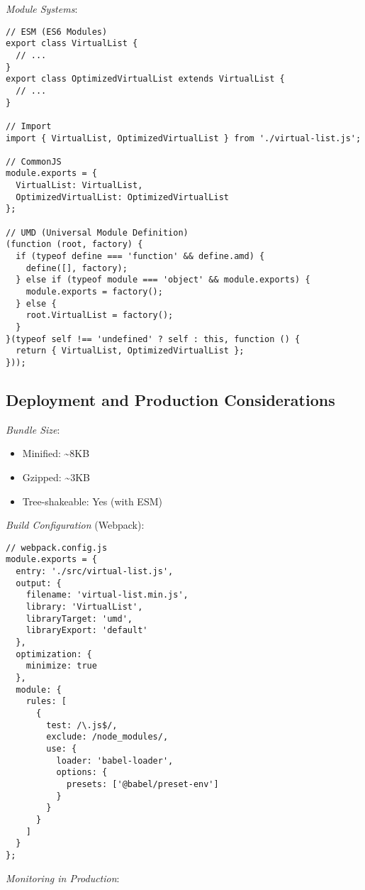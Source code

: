 \documentclass[11pt]{article}
\begin{document}
\emph{Module Systems}:

\begin{verbatim}
// ESM (ES6 Modules)
export class VirtualList {
  // ...
}
export class OptimizedVirtualList extends VirtualList {
  // ...
}

// Import
import { VirtualList, OptimizedVirtualList } from './virtual-list.js';

// CommonJS
module.exports = {
  VirtualList: VirtualList,
  OptimizedVirtualList: OptimizedVirtualList
};

// UMD (Universal Module Definition)
(function (root, factory) {
  if (typeof define === 'function' && define.amd) {
    define([], factory);
  } else if (typeof module === 'object' && module.exports) {
    module.exports = factory();
  } else {
    root.VirtualList = factory();
  }
}(typeof self !== 'undefined' ? self : this, function () {
  return { VirtualList, OptimizedVirtualList };
}));
\end{verbatim}
\subsection{Deployment and Production Considerations}
\label{sec:org7a26278}

\emph{Bundle Size}:
\begin{itemize}
\item Minified: \textasciitilde{}8KB
\item Gzipped: \textasciitilde{}3KB
\item Tree-shakeable: Yes (with ESM)
\end{itemize}

\emph{Build Configuration} (Webpack):

\begin{verbatim}
// webpack.config.js
module.exports = {
  entry: './src/virtual-list.js',
  output: {
    filename: 'virtual-list.min.js',
    library: 'VirtualList',
    libraryTarget: 'umd',
    libraryExport: 'default'
  },
  optimization: {
    minimize: true
  },
  module: {
    rules: [
      {
        test: /\.js$/,
        exclude: /node_modules/,
        use: {
          loader: 'babel-loader',
          options: {
            presets: ['@babel/preset-env']
          }
        }
      }
    ]
  }
};
\end{verbatim}

\emph{Monitoring in Production}:
\end{document}
